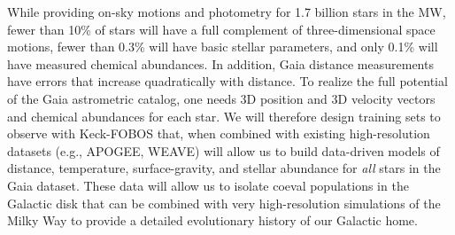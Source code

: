 \documentclass[oneside,11pt]{amsart}
\newcounter{chalno}
\newcommand{\chal}[1]{\refstepcounter{chalno}\label{#1}}
\begin{document}
\medskip \chal{gaia}  While
providing on-sky motions and photometry for 1.7 billion stars in the MW,
fewer than 10\% of stars will have a full complement of
three-dimensional space motions, fewer than 0.3\% will have basic
stellar parameters, and only 0.1\% will have measured chemical
abundances.  In addition, Gaia distance measurements have errors that
increase quadratically with distance.  To realize the full potential of
the Gaia astrometric catalog, one needs 3D position and 3D velocity
vectors and chemical abundances for each star.  We will therefore design
training sets to observe with Keck-FOBOS that, when combined with
existing high-resolution datasets (e.g., APOGEE, WEAVE) will allow us to
build data-driven models of distance, temperature, surface-gravity, and
stellar abundance for {\it all} stars in the Gaia dataset.  These data
will allow us to isolate coeval populations in the Galactic disk that
can be combined with very high-resolution simulations of the Milky Way
to provide a detailed evolutionary history of our Galactic home.






\end{document}
